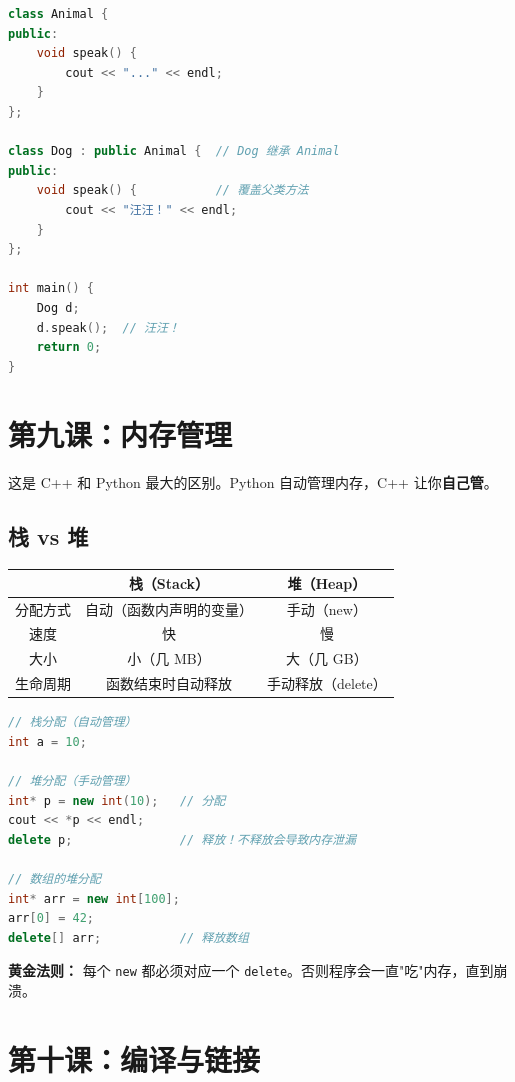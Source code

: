 \documentclass[a4paper,12pt]{ctexart}
\begin{document}
\begin{lstlisting}[language=C++]
class Animal {
public:
    void speak() {
        cout << "..." << endl;
    }
};

class Dog : public Animal {  // Dog 继承 Animal
public:
    void speak() {           // 覆盖父类方法
        cout << "汪汪！" << endl;
    }
};

int main() {
    Dog d;
    d.speak();  // 汪汪！
    return 0;
}
\end{lstlisting}

\section*{第九课：内存管理}

这是 C++ 和 Python 最大的区别。Python 自动管理内存，C++ 让你\textbf{自己管}。

\subsection*{栈 vs 堆}

\begin{center}
\begin{tabular}{|c|c|c|}
\hline
\textbf{} & \textbf{栈（Stack）} & \textbf{堆（Heap）} \\ \hline
分配方式 & 自动（函数内声明的变量） & 手动（new） \\ \hline
速度 & 快 & 慢 \\ \hline
大小 & 小（几 MB） & 大（几 GB） \\ \hline
生命周期 & 函数结束时自动释放 & 手动释放（delete） \\ \hline
\end{tabular}
\end{center}

\begin{lstlisting}[language=C++]
// 栈分配（自动管理）
int a = 10;

// 堆分配（手动管理）
int* p = new int(10);   // 分配
cout << *p << endl;     
delete p;               // 释放！不释放会导致内存泄漏

// 数组的堆分配
int* arr = new int[100];
arr[0] = 42;
delete[] arr;           // 释放数组
\end{lstlisting}

\textbf{黄金法则：} 每个 \texttt{new} 都必须对应一个 \texttt{delete}。否则程序会一直"吃"内存，直到崩溃。

\section*{第十课：编译与链接}
\end{document}
